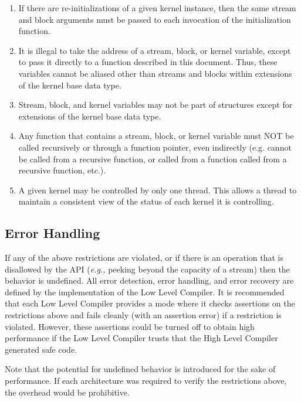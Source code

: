 \begin{enumerate}

\item If there are re-initializations of a given kernel instance, then
the same stream and block arguments must be passed to each invocation
of the initialization function.

\item It is illegal to take the address of a stream, block, or kernel
variable, except to pass it directly to a function described in this
document. Thus, these variables cannot be aliased other than streams
and blocks within extensions of the kernel base data type.

\item Stream, block, and kernel variables may not be part of
structures except for extensions of the kernel base data type.

\item Any function that contains a stream, block, or kernel variable
must NOT be called recursively or through a function pointer, even
indirectly (e.g. cannot be called from a recursive function, or called
from a function called from a recursive function, etc.).

\item A given kernel may be controlled by only one thread.  This
allows a thread to maintain a consistent view of the status of each
kernel it is controlling.

\end{enumerate}

\subsection{Error Handling}

If any of the above restrictions are violated, or if there is an
operation that is disallowed by the API ({\it e.g.,} peeking beyond
the capacity of a stream) then the behavior is undefined.  All error
detection, error handling, and error recovery are defined by the
implementation of the Low Level Compiler.  It is recommended that each
Low Level Compiler provides a mode where it checks assertions on the
restrictions above and fails cleanly (with an assertion error) if a
restriction is violated.  However, these assertions could be turned
off to obtain high performance if the Low Level Compiler trusts that
the High Level Compiler generated safe code.

Note that the potential for undefined behavior is introduced for the
sake of performance.  If each architecture was required to verify the
restrictions above, the overhead would be prohibitive.

